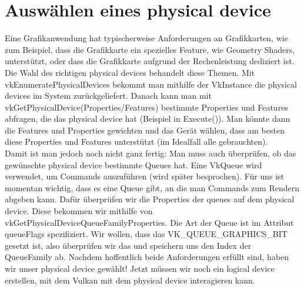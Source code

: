 \documentclass[11pt,a4paper]{report}
\begin{document}
\section{Auswählen eines physical device}
Eine Grafikanwendung hat typischerweise Anforderungen an Grafikkarten, wie zum Beispiel, dass die Grafikkarte ein spezielles Feature, wie Geometry Shaders, unterstützt, oder dass die Grafikkarte aufgrund der Rechenleistung dediziert ist. Die Wahl des richtigen physical devices behandelt diese Themen. Mit vkEnumeratePhysicalDevices bekommt man mithilfe der VkInstance die physical devices im System zurückgeliefert. Danach kann man mit vkGetPhysicalDevice(Properties/Features) bestimmte Properties und Features abfragen, die das physical device hat (Beispiel in Execute()). Man könnte dann die Features und Properties gewichten und das Gerät wählen, dass am besten diese Properties und Features unterstützt (im Idealfall alle gebrauchten).\\
Damit ist man jedoch noch nicht ganz fertig: Man muss auch überprüfen, ob das gewünschte physical device bestimmte Queues hat. Eine VkQueue wird verwendet, um Commands auszuführen (wird später besprochen). Für uns ist momentan wichtig, dass es eine Queue gibt, an die man Commands zum Rendern abgeben kann. Dafür überprüfen wir die Properties der queues auf dem physical device. Diese bekommen wir mithilfe von vkGetPhysicalDeviceQueueFamilyProperties. Die Art der Queue ist im Attribut queueFlags spezifiziert. Wir wollen, dass das VK\_QUEUE\_GRAPHICS\_BIT gesetzt ist, also überprüfen wir das und speichern uns den Index der QueueFamily ab. Nachdem hoffentlich beide Anforderungen erfüllt sind, haben wir unser physical device gewählt! Jetzt müssen wir noch ein logical device erstellen, mit dem Vulkan mit dem physical device interagieren kann.
\end{document}
